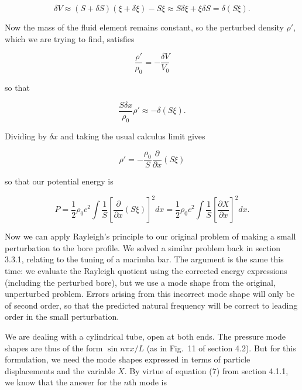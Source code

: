   \begin{equation*}\delta V \approx (S+\delta S)(\xi + \delta \xi) -S \xi 
  \approx S \delta \xi + \xi \delta S =\delta(S \xi) . \tag{5}\end{equation*} 

  Now the mass of the fluid element remains constant, so the perturbed density 
  $\rho'$, which we are trying to find, satisfies 

  \begin{equation*}\dfrac{\rho'}{\rho_0}=-\dfrac{\delta V}{V_0} 
  \tag{6}\end{equation*} 

  \noindent{}so that 

  \begin{equation*}\dfrac{S \delta x}{\rho_0}\rho' \approx -\delta(S \xi) . 
  \tag{7}\end{equation*} 

  Dividing by $\delta x$ and taking the usual calculus limit gives 

  \begin{equation*}\rho'=-\dfrac{\rho_0}{S}\dfrac{\partial}{\partial x}(S \xi) 
  \tag{8}\end{equation*} 

  \noindent{}so that our potential energy is 

  \begin{equation*}P=\dfrac{1}{2} \rho_0 c^2 
  \int{\dfrac{1}{S}\left[\dfrac{\partial}{\partial x}(S \xi)\right]^2 
  dx}=\dfrac{1}{2} \rho_0 c^2 \int{\dfrac{1}{S}\left[\dfrac{\partial 
  X}{\partial x}\right]^2 dx} . \tag{9}\end{equation*} 

  Now we can apply Rayleigh's principle to our original problem of making a 
  small perturbation to the bore profile. We solved a similar problem back in 
  section 3.3.1, relating to the tuning of a marimba bar. The argument is the 
  same this time: we evaluate the Rayleigh quotient using the corrected energy 
  expressions (including the perturbed bore), but we use a mode shape from the 
  original, unperturbed problem. Errors arising from this incorrect mode shape 
  will only be of second order, so that the predicted natural frequency will be 
  correct to leading order in the small perturbation. 

  We are dealing with a cylindrical tube, open at both ends. The pressure mode 
  shapes are thus of the form $\sin n \pi x/L$ (as in Fig.\ 11 of section 4.2). 
  But for this formulation, we need the mode shapes expressed in terms of 
  particle displacements and the variable $X$. By virtue of equation (7) from 
  section 4.1.1, we know that the answer for the $n\mathrm{th}$ mode is 

